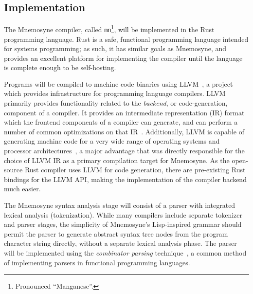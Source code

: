 \documentclass[11pt,a4paper]{article}
\theoremstyle{break}
\begin{document}
\subsection{Implementation}

The Mnemosyne compiler, called \texttt{mn}\footnote{Pronounced ``Manganese''.}, will be implemented in the Rust programming language. Rust is a safe, functional programming language intended for systems programming; as such, it has similar goals as Mnemosyne, and provides an excellent platform for implementing the compiler until the language is complete enough to be self-hosting.

Programs will be compiled to machine code binaries using LLVM~\cite{Lattner:2004:LCF:977395.977673}, a project which provides infrastructure for programming language compilers. LLVM primarily provides functionality related to the \textit{backend}, or code-generation, component of a compiler. It provides an intermediate representation (IR) format which the frontend components of a compiler can generate, and can perform a number of common optimizations on that IR~\cite{Lattner:2004:LCF:977395.977673,Terei:2010:LBG:1863523.1863538}. Additionally, LLVM is capable of generating machine code for a very wide range of operating systems and processor architectures~\cite{Lattner:2004:LCF:977395.977673,Terei:2010:LBG:1863523.1863538}, a major advantage that was directly responsible for the choice of LLVM IR as a primary compilation target for Mnemosyne. As the open-source Rust compiler uses LLVM for code generation, there are pre-existing Rust bindings for the LLVM API, making the implementation of the compiler backend much easier.

The Mnemosyne syntax analysis stage will consist of a parser with integrated lexical analysis (tokenization). While many compilers include separate tokenizer and parser stages, the simplicity of Mnemosyne's Lisp-inspired grammar should permit the parser to generate abstract syntax tree nodes from the program character string directly, without a separate lexical analysis phase. The parser will be implemented using the \textit{combinator parsing} technique~\cite{swierstra2001combinator,frost2008parser,fokker1995functional,hutton1996monadic}, a common method of implementing parsers in functional programming languages.
\end{document}
